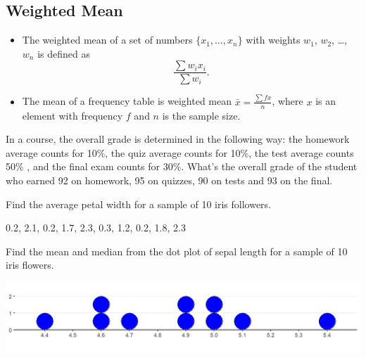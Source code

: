 \hypertarget{weighted-mean}{%
\subsection{Weighted Mean}\label{weighted-mean}}

\begin{itemize}
\item
  The weighted mean of a set of numbers \(\{x_1, \dots, x_n\}\) with
  weights \(w_1\), \(w_2\), \ldots, \(w_n\) is defined as
  \[\frac{\sum w_ix_i}{\sum w_i}.\]
\item
  The mean of a frequency table is weighted mean
  \(\bar{x}=\frac{\sum f x}{n}\), where \(x\) is an element with
  frequency \(f\) and \(n\) is the sample size.
\end{itemize}

\begin{example}

In a course, the overall grade is determined in the following way: the
homework average counts for 10\%, the quiz average counts for 10\%, the
test average counts 50\% , and the final exam counts for 30\%. What's
the overall grade of the student who earned 92 on homework, 95 on
quizzes, 90 on tests and 93 on the final.

\end{example}
\vspace*{6\baselineskip}

\begin{exercise}

Find the average petal width for a sample of 10 iris followers.

0.2, 2.1, 0.2, 1.7, 2.3, 0.3, 1.2, 0.2, 1.8, 2.3

\end{exercise}
\vspace*{6\baselineskip}

\begin{exercise}

Find the mean and median from the dot plot of sepal length for a sample
of 10 iris flowers.

\begin{fullwidth}
  \begin{center}
    \includegraphics[width=0.8\linewidth]{Figures/MeanMedian-from-Dotplot.png}
  \end{center}
\end{fullwidth}

\end{exercise}
\vspace*{6\baselineskip}

